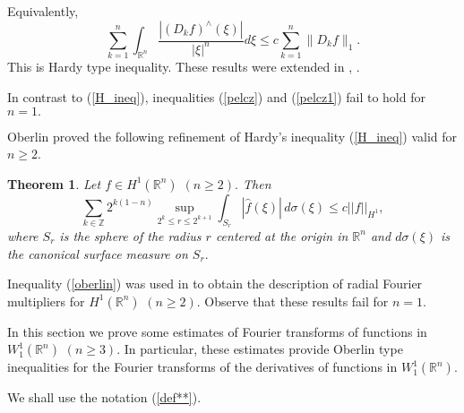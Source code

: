 \documentclass[12pt,twoside,reqno]{amsart}
\numberwithin{equation}{section}
\newtheorem{teo}{Theorem}[section]
\theoremstyle{definition}
\numberwithin{equation}{section}
\def\R{\mathbb{R}}
\def\Z{\mathbb{Z}}
\def\s{\sigma}
\begin{document}
Equivalently,
\begin{equation}\label{pelcz1}
\sum _{k=1}^n\int_{\mathbb{R}^n}\frac{|(D_k
f)^\land(\xi)|}{|\xi|^n}d\xi \le c \sum _{k=1}^n\|D_k f\|_1.
\end{equation}
This is  Hardy type inequality. These results were extended in \cite{K1997}, \cite{K01}.

In contrast to (\ref{H_ineq}), inequalities  (\ref{pelcz}) and  (\ref{pelcz1}) fail to hold for $n=1.$

 Oberlin \cite{Ober}    proved the following refinement of Hardy's inequality (\ref{H_ineq}) valid for $n\ge 2$.

\begin{teo}\label{Oberlin} Let  $f\in H^1(\R^n)$ $(n\ge 2).$ Then
\begin{equation}\label{oberlin}
\sum_{k\in\Z} 2^{k(1-n)}\sup_{2^k\le r\le 2^{k+1}}\int_{S_r} |\widehat{f}(\xi)|\,d\s(\xi)\le c||f||_{H^1},
\end{equation}
where $S_r$ is the sphere of the radius $r$ centered at the origin in $\R^n$ and $d\s(\xi)$ is the canonical surface measure on $S_r.$
\end{teo}

Inequality (\ref{oberlin}) was used in \cite{Ober} to obtain the description of radial Fourier multipliers for $H^1(\R^n)$ $(n\ge 2).$
Observe that these results fail for $n=1.$

In this section we prove some estimates of Fourier transforms of functions in $W_1^1(\R^n)$ $(n\ge 3).$
In particular, these estimates provide Oberlin type inequalities for the Fourier transforms of the derivatives of
functions in $W_1^1(\R^n)$.

We shall use the notation (\ref{def**}).
\end{document}
